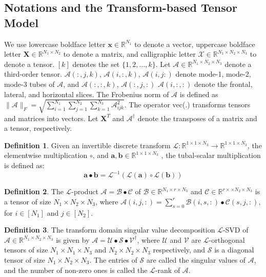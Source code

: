 \documentclass[futureinternet,article,submit,moreauthors,pdftex,10pt,a4paper]{Definitions/mdpi}
\theoremstyle{plain}
\theoremstyle{definition}
\newtheorem{defn}{Definition}[section]
\theoremstyle{remark}
\begin{document}
\subsection{Notations and the Transform-based Tensor Model}
We use lowercase boldface letter $\mathbf{x} \in \mathbb{R}^{N_1}$ to denote a vector, uppercase boldface letter $\mathbf{X} \in \mathbb{R}^{N_1 \times N_2}$ to denote a matrix, 
and calligraphic letter $\mathcal{X} \in \mathbb{R}^{N_1 \times N_2 \times N_3}$ to denote a tensor. $[k]$ denotes the set $\{1,2,\dots, k\}$. Let $\mathcal{A} \in \mathbb{R}^{N_1 \times N_2 \times N_3}$ 
denote a third-order tensor. $\mathcal{A}(:,j,k)$, $\mathcal{A}(i,:,k)$, $\mathcal{A}(i,j:)$ denote mode-1, mode-2, mode-3 tubes of $\mathcal{A}$, and $\mathcal{A}(:,:,k)$, $\mathcal{A}(:,j,:)$ $\mathcal{A}(i,:,:)$ 
denote the frontal, lateral, and horizontal slices. The Frobenius norm of $\mathcal{A}$ is defined as $\|\mathcal{A}\|_F = \sqrt{\sum ^{N_1}_{i = 1} \sum ^{N_2}_{j = 1} \sum ^{N_3}_{k = 1} \mathcal{A}^2_{ijk}}$.
The operator vec(.) transforms tensors and matrices into vectors. Let $\mathbf{X}^{T}$ and $\mathcal{A}^{\dagger}$ denote the transposes of a matrix and a tensor, respectively.
\begin{defn}\cite{liu2017fourth}
    Given an invertible discrete transform $\mathcal{L}:\mathbb{R}^{1\times 1 \times N_3} \to \mathbb{R}^{1\times 1\times N_3}$, the elementwise multiplication $\circ$, and $\mathbf{a}, \mathbf{b} \in \mathbb{R}^{1\times 1\times N_3}$ , the tubal-scalar multiplication is defined as:
        \begin{equation}
            \mathbf{a} \bullet \mathbf{b} = \mathcal{L}^{-1}(\mathcal{L}(\mathbf{a})\circ \mathcal{L}(\mathbf{b}))
        \end{equation}
\end{defn}

\begin{defn}\cite{liu2017fourth}
    The $\mathcal{L}$-product $\mathcal{A} = \mathcal{B} \bullet \mathcal{C}$ of $\mathcal{B} \in \mathbb{R}^{N_1 \times r \times N_3}$ and $\mathcal{C} \in \mathbb{R}^{r\times \times N_2 \times N_3}$ is a tensor of size $N_1 \times N_2 \times N_3$, where $\mathcal{A}(i,j,:) = \sum^r_{s=0}\mathcal{B}(i,s,:)\bullet \mathcal{C}(s,j,:)$, for $i \in [N_1]$ and $j \in [N_2]$.
\end{defn}

\begin{defn}\cite{liu2017fourth}
    The transform domain singular value decomposition $\mathcal{L}$-SVD of $\mathcal{A} \in \mathbb{R}^{N_1 \times N_2 \times N_3}$ is given by $\mathcal{A} = \mathcal{U} \bullet \mathcal{S} \bullet \mathcal{V}^{\dagger}$, where $\mathcal{U}$ and $\mathcal{V}$ are $\mathcal{L}$-orthogonal tensors of size $N_1 \times N_1 \times N_3$ and $N_2 \times N_2 \times N_3$ respectively, and $\mathcal{S}$ is a diagonal tensor of size $N_1 \times N_2 \times N_3$. The entries of $\mathcal{S}$ are called the singular values of $\mathcal{A}$, and the number of non-zero ones is called the $\mathcal{L}$-rank of $\mathcal{A}$.
\end{defn}
\end{document}
